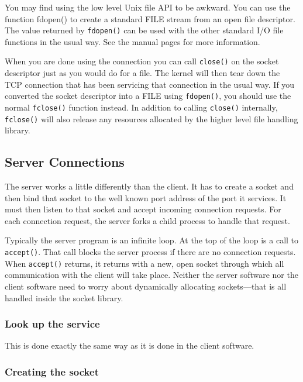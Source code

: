 \documentclass{article}
\begin{document}
You may find using the low level Unix file API to be awkward. You can use the function fdopen() to create a standard FILE stream from an open file descriptor. The value returned by \texttt{fdopen()} can be used with the other standard I/O file functions in the usual way. See the manual pages for more information.

When you are done using the connection you can call \texttt{close()} on the socket descriptor just as you would do for a file. The kernel will then tear down the TCP connection that has been servicing that connection in the usual way. If you converted the socket descriptor into a FILE using \texttt{fdopen()}, you should use the normal \texttt{fclose()} function instead. In addition to calling \texttt{close()} internally, \texttt{fclose()} will also release any resources allocated by the higher level file handling library.


\subsection{Server Connections}

The server works a little differently than the client. It has to create a socket and then bind that socket to the well known port address of the port it services. It must then listen to that socket and accept incoming connection requests. For each connection request, the server forks a child process to handle that request.

Typically the server program is an infinite loop. At the top of the loop is a call to \texttt{accept()}. That call blocks the server process if there are no connection requests. When \texttt{accept()} returns, it returns with a new, open socket through which all communication with the client will take place. Neither the server software nor the client software need to worry about dynamically allocating sockets---that is all handled inside the socket library.

\subsubsection{Look up the service}

This is done exactly the same way as it is done in the client software.

\subsubsection{Creating the socket}
\end{document}
